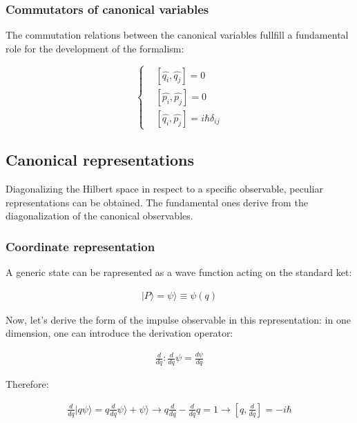 \documentclass{report}
\begin{document}
\subsubsection{Commutators of canonical variables}

The commutation relations between the canonical variables fullfill a fundamental role for the development of the formalism:

\begin{equation}
  \left\{
  \begin{aligned}
     & [\hat{q_i}, \hat{q_j}]=0                  \\
     & [\hat{p_i}, \hat{p_j}]=0                  \\
     & [\hat{q_i}, \hat{p_j}]=i\hbar \delta_{ij}
  \end{aligned}
  \right.
\end{equation}

\subsection{Canonical representations}
Diagonalizing the Hilbert space in respect to a specific observable, peculiar representations can be obtained.
The fundamental ones derive from the diagonalization of the canonical observables.

\subsubsection{Coordinate representation}

A generic state can be rapresented as a wave function acting on the standard ket:

\begin{align*}
  |P\rangle = \psi\rangle \equiv \psi(q)
\end{align*}

Now, let's derive the form of the impulse observable in this representation:
in one dimension, one can introduce the derivation operator:

\begin{align*}
  \frac{d}{dq} : \frac{d}{dq} \psi = \frac{d \psi}{dq}
\end{align*}

Therefore:


\begin{align*}
  \frac{d}{dq} |q\psi\rangle = q\frac{d}{dq}\psi\rangle  + \psi\rangle  \longrightarrow q\frac{d}{dq}-\frac{d}{dq}q=1 \longrightarrow [q,\frac{d}{dq}]=-i\hbar
\end{align*}
\end{document}
